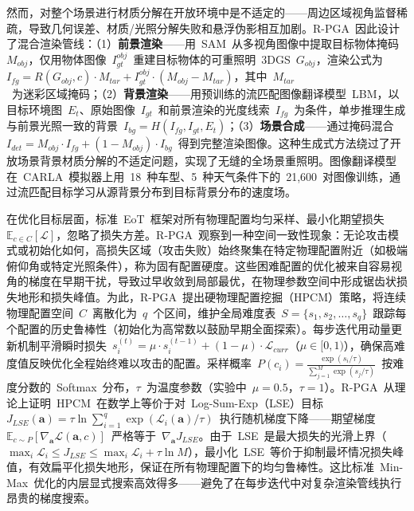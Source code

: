 然而，对整个场景进行材质分解在开放环境中是不适定的——周边区域视角监督稀疏，导致几何误差、材质/光照分解失败和悬浮伪影相互加剧。R-PGA~因此设计了混合渲染管线：（1）\textbf{前景渲染}——用~SAM~从多视角图像中提取目标物体掩码~$M_{obj}$，仅用物体图像~$I_{gt}^{obj}$~重建目标物体的可重照明~3DGS~$G_{obj}$，渲染公式为~$I_{fg} = R(G_{obj}, c) \cdot M_{tar} + I_{gt}^{obj} \cdot (M_{obj} - M_{tar})$，其中~$M_{tar}$~为迷彩区域掩码；（2）\textbf{背景渲染}——用预训练的流匹配图像翻译模型~LBM，以目标环境图~$E_t$、原始图像~$I_{gt}$~和前景渲染的光度线索~$I_{fg}$~为条件，单步推理生成与前景光照一致的背景~$I_{bg} = H(I_{fg}, I_{gt}, E_t)$；（3）\textbf{场景合成}——通过掩码混合~$I_{det} = M_{obj} \cdot I_{fg} + (1 - M_{obj}) \cdot I_{bg}$~得到完整渲染图像。这种生成式方法绕过了开放场景背景材质分解的不适定问题，实现了无缝的全场景重照明。图像翻译模型在~CARLA~模拟器上用~18~种车型、5~种天气条件下的~21,600~对图像训练，通过流匹配目标学习从源背景分布到目标背景分布的速度场。

在优化目标层面，标准~EoT~框架对所有物理配置均匀采样、最小化期望损失~$\mathbb{E}_{c \in C}[\mathcal{L}]$，忽略了损失方差。R-PGA~观察到一种空间一致性现象：无论攻击模式或初始化如何，高损失区域（攻击失败）始终聚集在特定物理配置附近（如极端俯仰角或特定光照条件），称为固有配置硬度。这些困难配置的优化被来自容易视角的梯度在早期干扰，导致过早收敛到局部最优，在物理参数空间中形成锯齿状损失地形和损失峰值。为此，R-PGA~提出硬物理配置挖掘（HPCM）策略，将连续物理配置空间~$C$~离散化为~$q$~个区间，维护全局难度表~$S = \{s_1, s_2, \ldots, s_q\}$~跟踪每个配置的历史鲁棒性（初始化为高常数以鼓励早期全面探索）。每步迭代用动量更新机制平滑瞬时损失~$s_i^{(t)} = \mu \cdot s_i^{(t-1)} + (1-\mu) \cdot \mathcal{L}_{curr}$（$\mu \in [0,1)$），确保高难度值反映优化全程始终难以攻击的配置。采样概率~$P(c_i) = \frac{\exp(s_i / \tau)}{\sum_{j=1}^M \exp(s_j / \tau)}$~按难度分数的~Softmax~分布，$\tau$~为温度参数（实验中~$\mu = 0.5$，$\tau = 1$）。R-PGA~从理论上证明~HPCM~在数学上等价于对~Log-Sum-Exp（LSE）目标~$J_{LSE}(\mathbf{a}) = \tau \ln \sum_{i=1}^q \exp(\mathcal{L}_i(\mathbf{a}) / \tau)$~执行随机梯度下降——期望梯度~$\mathbb{E}_{c \sim P}[\nabla_{\mathbf{a}} \mathcal{L}(\mathbf{a}, c)]$~严格等于~$\nabla_{\mathbf{a}} J_{LSE}$。由于~LSE~是最大损失的光滑上界（$\max_i \mathcal{L}_i \leq J_{LSE} \leq \max_i \mathcal{L}_i + \tau \ln M$），最小化~LSE~等价于抑制最坏情况损失峰值，有效扁平化损失地形，保证在所有物理配置下的均匀鲁棒性。这比标准~Min-Max~优化的内层显式搜索高效得多——避免了在每步迭代中对复杂渲染管线执行昂贵的梯度搜索。

